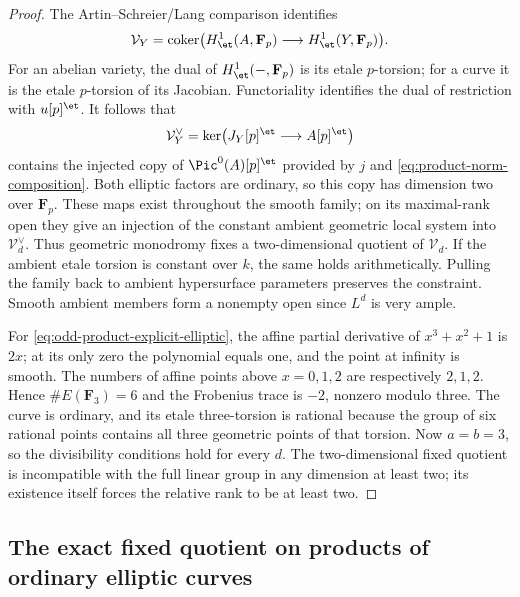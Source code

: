 \begin{proof}
The Artin--Schreier/Lang comparison identifies
\[
 \mathcal V_Y=\operatorname{coker}
       \bigl(H^1_{\et}(A,\mathbf F_p)
                 \longrightarrow H^1_{\et}(Y,\mathbf F_p)\bigr).
\]
For an abelian variety, the dual of $H^1_{\et}(-,\mathbf F_p)$
is its etale $p$-torsion; for a curve it is the etale
$p$-torsion of its Jacobian.  Functoriality identifies
the dual of restriction with $u[p]^{\et}$.
It follows that
\[
 \mathcal V_Y^\vee
   =\ker\bigl(J_Y[p]^{\et}\longrightarrow A[p]^{\et}\bigr)
\]
contains the injected copy of $\Pic^0(A)[p]^{\et}$
provided by $j$ and \eqref{eq:product-norm-composition}.
Both elliptic factors are ordinary, so this copy has
dimension two over $\mathbf F_p$.
These maps exist throughout the smooth family; on its
maximal-rank open they give an injection of the constant
ambient geometric local system into $\mathcal V_d^\vee$.
Thus geometric monodromy fixes a two-dimensional quotient
of $\mathcal V_d$.  If the ambient etale torsion is
constant over $k$, the same holds arithmetically.
Pulling the family back to ambient hypersurface
parameters preserves the constraint.  Smooth ambient
members form a nonempty open since $L^d$ is very ample.

For \eqref{eq:odd-product-explicit-elliptic}, the affine
partial derivative of $x^3+x^2+1$ is $2x$; at its only
zero the polynomial equals one, and the point at
infinity is smooth.  The numbers of affine points
above $x=0,1,2$ are respectively $2,1,2$.
Hence $\#E(\mathbf F_3)=6$ and the Frobenius trace
is $-2$, nonzero modulo three.  The curve is ordinary,
and its etale three-torsion is rational because the
group of six rational points contains all three
geometric points of that torsion.
Now $a=b=3$, so the divisibility conditions hold for
every $d$.  The two-dimensional fixed quotient is
incompatible with the full linear group in any
dimension at least two; its existence itself forces
the relative rank to be at least two.
\end{proof}


\subsection{The exact fixed quotient on products of ordinary elliptic curves}
\label{subsec:product-exact-fixed-quotient}

